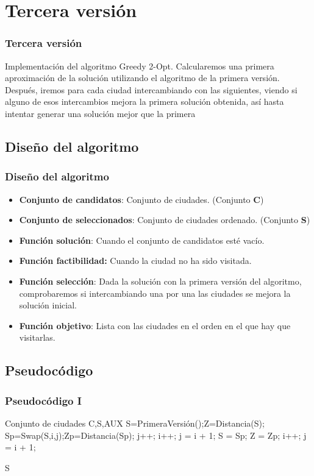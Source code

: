 \documentclass{beamer}
\begin{document}
\section{Tercera versión} 
\begin{frame}
	\frametitle{Tercera versión}
	Implementación del algoritmo Greedy 2-Opt. Calcularemos una primera aproximación de la solución utilizando el algoritmo de la primera versión. Después, iremos para cada ciudad intercambiando con las siguientes, viendo si alguno de esos intercambios mejora la primera solución obtenida, así hasta intentar generar una solución mejor que la primera
\end{frame}

\subsection{Diseño del algoritmo} 
\begin{frame}
	\frametitle{Diseño del algoritmo}
	\begin{itemize}
		\item \textbf{Conjunto de candidatos}: Conjunto de ciudades. (Conjunto \textbf{C})
		\item \textbf{Conjunto de seleccionados}: Conjunto de ciudades ordenado. (Conjunto \textbf{S})
		\item \textbf{Función solución}: Cuando el conjunto de candidatos esté vacío.
		\item \textbf{Función factibilidad:} Cuando la ciudad no ha sido visitada.
		\item \textbf{Función selección}: Dada la solución con la primera versión del algoritmo, comprobaremos si intercambiando una por una las ciudades se mejora la solución inicial.
		\item \textbf{Función objetivo}: Lista con las ciudades en el orden en el que hay que visitarlas.		
	\end{itemize}
	
\end{frame}

\subsection{Pseudocódigo}
\begin{frame}
	\frametitle{Pseudocódigo I}
	\begin{algorithmic}				
		\Require Conjunto de ciudades C,S,AUX
		\State S=PrimeraVersión();Z=Distancia(S);
			\State Sp=Swap(S,i,j);Zp=Distancia(Sp);
				\State j++;
			\EndIf
				\State i++; j = i + 1; 
			\EndIf
				\State S = Sp; Z = Zp;
				\State i++; j = i + 1;
			\EndIf
		\EndWhile  
		
		\Return S	
		
	\end{algorithmic}
	
	
\end{frame}
\end{document}
